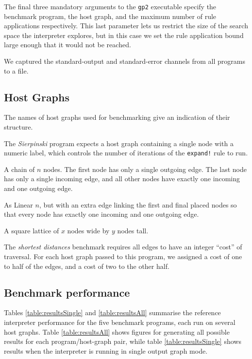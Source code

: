 The final three mandatory arguments to the \texttt{gp2} executable specify the benchmark program, the host graph, and the maximum number of rule applications respectively. This last parameter lets us restrict the size of the search space the interpreter explores, but in this case we set the rule application bound large enough that it would not be reached.

We captured the standard-output and standard-error channels from all programs to a file.

\subsection{Host Graphs}
\label{subsec:hosts}

The names of host graphs used for benchmarking give an indication of their structure.

\begin{description}
	\setlength\itemsep{-0.2em}
	\item[Gen $n$] The \textit{Sierpinski} program expects a host graph containing a single node with a numeric label, which controls the number of iterations of the \texttt{expand!} rule to run.

	\item[Linear $n$] A chain of $n$ nodes. The first node has only a single outgoing edge. The last node has only a single incoming edge, and all other nodes have exactly one incoming and one outgoing edge.

	\item[Cyclic $n$] As Linear $n$, but with an extra edge linking the first and final placed nodes so that every node has exactly one incoming and one outgoing edge.

	\item[$x \times y$ Grid] A square lattice of $x$ nodes wide by $y$ nodes tall.
\end{description}

The \textit{shortest distances} benchmark requires all edges to have an integer ``cost'' of traversal. For each host graph passed to this program, we assigned a cost of one to half of the edges, and a cost of two to the other half.



\subsection{Benchmark performance}\label{sec:benchperf}

Tables \ref{table:resultsSingle} and \ref{table:resultsAll} summarise the reference interpreter performance for the five benchmark programs, each run on several host graphs. Table \ref{table:resultsAll} shows figures for generating all possible results for each program/host-graph pair, while table \ref{table:resultsSingle} shows results when the interpreter is running in single output graph mode.


